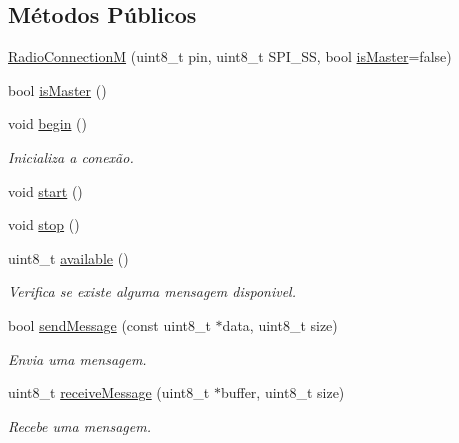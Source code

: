 \subsection*{Métodos Públicos}
\begin{DoxyCompactItemize}
\item 
\hyperlink{classRadioConnectionM_af147210568643b306924569d784fd5f1}{Radio\-Connection\-M} (uint8\-\_\-t pin, uint8\-\_\-t S\-P\-I\-\_\-\-S\-S, bool \hyperlink{classRadioConnectionM_a1db28139196c1f2fe17695f999dc3546}{is\-Master}=false)
\item 
bool \hyperlink{classRadioConnectionM_a1db28139196c1f2fe17695f999dc3546}{is\-Master} ()
\item 
void \hyperlink{classRadioConnectionM_acbfe7d993586efe2681e8fc07dcda463}{begin} ()
\begin{DoxyCompactList}\small\item\em Inicializa a conexão. \end{DoxyCompactList}\item 
void \hyperlink{classRadioConnectionM_a5486c1bcdd27afcf2e9dc5cccfd08660}{start} ()
\item 
void \hyperlink{classRadioConnectionM_a0deea36b1ed4dff4ce046bd008cb0da3}{stop} ()
\item 
uint8\-\_\-t \hyperlink{classRadioConnectionM_adfdbc2eb940e3a2a3798a76f02ea048a}{available} ()
\begin{DoxyCompactList}\small\item\em Verifica se existe alguma mensagem disponivel. \end{DoxyCompactList}\item 
bool \hyperlink{classRadioConnectionM_a8a4b19506bf383a0426023bef888e5a5}{send\-Message} (const uint8\-\_\-t $\ast$data, uint8\-\_\-t size)
\begin{DoxyCompactList}\small\item\em Envia uma mensagem. \end{DoxyCompactList}\item 
uint8\-\_\-t \hyperlink{classRadioConnectionM_a28ee1d2377f4d280723ce679b9f3db39}{receive\-Message} (uint8\-\_\-t $\ast$buffer, uint8\-\_\-t size)
\begin{DoxyCompactList}\small\item\em Recebe uma mensagem. \end{DoxyCompactList}\end{DoxyCompactItemize}


